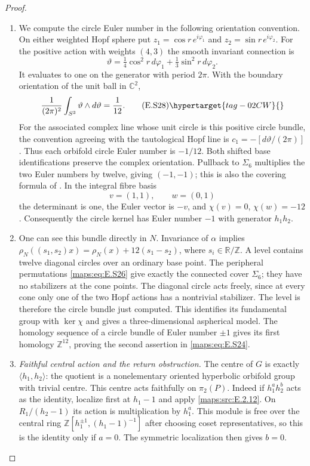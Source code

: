 \begin{proof}
\begin{enumerate}[label={$\langle1\rangle$\arabic*.},leftmargin=*]
\item We compute the circle Euler number in the following orientation convention. On either weighted Hopf sphere put
$z_1=\cos r\,e^{i\varphi_1}$ and
$z_2=\sin r\,e^{i\varphi_2}$. For the positive action with
weights $(4,3)$ the smooth invariant connection is
\[
 \vartheta=\tfrac14\cos^2r\,d\varphi_1
                    +\tfrac13\sin^2r\,d\varphi_2.
\]
It evaluates to one on the generator with period $2\pi$.
With the boundary orientation of the unit ball in $\mathbb C^2$,
\[
             \frac1{(2\pi)^2}\int_{S^3}\vartheta\wedge d\vartheta
                         =\frac1{12}.
 \tag{E.S28}\hypertarget{tag-02CW}{}\label{maps:eq:E.S28}
\]
For the associated complex line whose unit circle is this
positive circle bundle, the convention agreeing with the
tautological Hopf line is $c_1=-[d\vartheta/(2\pi)]$.
Thus each orbifold circle Euler number is $-1/12$.
Both shifted base identifications preserve the complex
orientation. Pullback to $\Sigma_6$ multiplies the two Euler
numbers by twelve, giving $(-1,-1)$; this is also the
covering formula of \cite[Theorem 3.6]{rootScott83}.
In the integral fibre basis
\[
                  v=(1,1),\qquad w=(0,1)
\]
the determinant is one, the Euler vector is $-v$, and
$\chi(v)=0$, $\chi(w)=-12$. Consequently the circle kernel
has Euler number $-1$ with generator $h_1h_2$.

\item One can see this bundle directly in $N$. Invariance of
$\alpha$ implies
$\rho_N((s_1,s_2)x)=\rho_N(x)+12(s_1-s_2)$, where
$s_i\in\mathbb R/\mathbb Z$. A level contains twelve
diagonal circles over an ordinary base point. The peripheral
permutations \eqref{maps:eq:E.S26} give exactly the connected cover
$\Sigma_6$; they have no stabilizers at the cone points.
The diagonal circle acts freely, since at every cone only
one of the two Hopf actions has a nontrivial stabilizer.
The level is therefore the circle bundle just computed.
This identifies its fundamental group with $\ker\chi$
and gives a three-dimensional aspherical model.
The homology sequence of a circle bundle of Euler number
$\pm1$ gives its first homology $\mathbb Z^{12}$, proving
the second assertion in \eqref{maps:eq:E.S24}.

\item \emph{Faithful central action and the return obstruction.}
The centre of $G$ is exactly $\langle h_1,h_2\rangle$:
the quotient is a nonelementary oriented hyperbolic orbifold
group with trivial centre. This centre acts faithfully on
$\pi_2(P)$. Indeed if $h_1^a h_2^b$ acts as the identity,
localize first at $h_1-1$ and apply \ref{maps:src:E.2.12}. On
$R_1/(h_2-1)$ its action is multiplication by $h_1^a$.
This module is free over the central ring
$\mathbb Z[h_1^{\pm1},(h_1-1)^{-1}]$ after choosing coset
representatives, so this is the identity only if $a=0$.
The symmetric localization then gives $b=0$.


\end{enumerate}
\end{proof}
